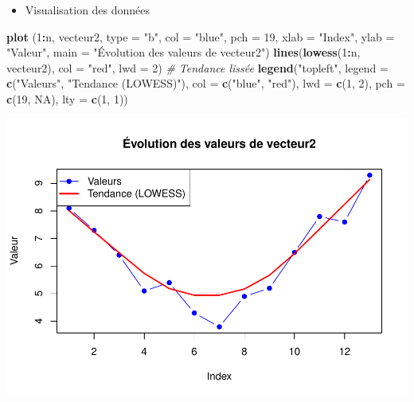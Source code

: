 \documentclass[
  12pt,
]{article}
\newenvironment{Shaded}{\begin{snugshade}}{\end{snugshade}}
\newcommand{\AttributeTok}[1]{\textcolor[rgb]{0.13,0.29,0.53}{#1}}
\newcommand{\CommentTok}[1]{\textcolor[rgb]{0.56,0.35,0.01}{\textit{#1}}}
\newcommand{\ConstantTok}[1]{\textcolor[rgb]{0.56,0.35,0.01}{#1}}
\newcommand{\DecValTok}[1]{\textcolor[rgb]{0.00,0.00,0.81}{#1}}
\newcommand{\FunctionTok}[1]{\textcolor[rgb]{0.13,0.29,0.53}{\textbf{#1}}}
\newcommand{\NormalTok}[1]{#1}
\newcommand{\SpecialCharTok}[1]{\textcolor[rgb]{0.81,0.36,0.00}{\textbf{#1}}}
\newcommand{\StringTok}[1]{\textcolor[rgb]{0.31,0.60,0.02}{#1}}
\providecommand{\tightlist}{%
  \setlength{\itemsep}{0pt}\setlength{\parskip}{0pt}}
\begin{document}
\begin{itemize}
\tightlist
\item
  Visualisation des données
\end{itemize}

\begin{Shaded}
\begin{Highlighting}[]
\FunctionTok{plot}\NormalTok{ (}\DecValTok{1}\SpecialCharTok{:}\NormalTok{n, vecteur2, }\AttributeTok{type =} \StringTok{"b"}\NormalTok{, }\AttributeTok{col =} \StringTok{"blue"}\NormalTok{, }\AttributeTok{pch =} \DecValTok{19}\NormalTok{,}
     \AttributeTok{xlab =} \StringTok{"Index"}\NormalTok{, }\AttributeTok{ylab =} \StringTok{"Valeur"}\NormalTok{, }\AttributeTok{main =} \StringTok{"Évolution des valeurs de vecteur2"}\NormalTok{)}
\FunctionTok{lines}\NormalTok{(}\FunctionTok{lowess}\NormalTok{(}\DecValTok{1}\SpecialCharTok{:}\NormalTok{n, vecteur2), }\AttributeTok{col =} \StringTok{"red"}\NormalTok{, }\AttributeTok{lwd =} \DecValTok{2}\NormalTok{)  }\CommentTok{\# Tendance lissée}
\FunctionTok{legend}\NormalTok{(}\StringTok{"topleft"}\NormalTok{, }\AttributeTok{legend =} \FunctionTok{c}\NormalTok{(}\StringTok{"Valeurs"}\NormalTok{, }\StringTok{"Tendance (LOWESS)"}\NormalTok{), }
       \AttributeTok{col =} \FunctionTok{c}\NormalTok{(}\StringTok{"blue"}\NormalTok{, }\StringTok{"red"}\NormalTok{), }\AttributeTok{lwd =} \FunctionTok{c}\NormalTok{(}\DecValTok{1}\NormalTok{, }\DecValTok{2}\NormalTok{), }\AttributeTok{pch =} \FunctionTok{c}\NormalTok{(}\DecValTok{19}\NormalTok{, }\ConstantTok{NA}\NormalTok{), }\AttributeTok{lty =} \FunctionTok{c}\NormalTok{(}\DecValTok{1}\NormalTok{, }\DecValTok{1}\NormalTok{))}
\end{Highlighting}
\end{Shaded}

\includegraphics{Stat_non_para_files/figure-latex/unnamed-chunk-22-1.pdf}
\end{document}
